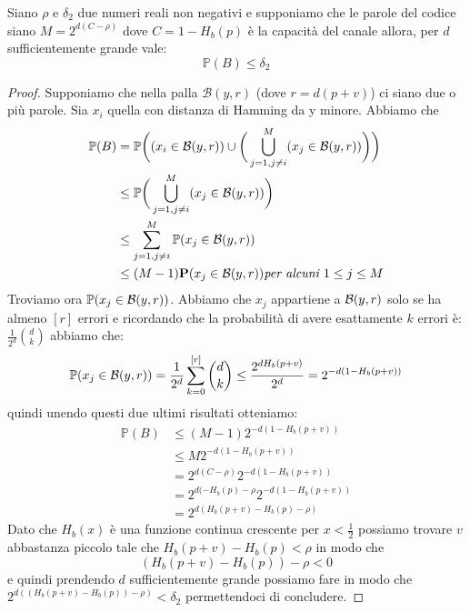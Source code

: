\begin{lem}
Siano $\rho$ e $\delta_2$ due numeri reali non negativi e supponiamo che le parole del codice siano $M=2^{d(C-\rho)}$ dove $C=1-H_b(p)$ è la capacità del canale allora, per $d$ sufficientemente grande vale:
$$\mathbb{P}(B)\leq \delta_2$$
\end{lem}
\begin{proof}
Supponiamo che nella palla $\mathcal{B}(y,r)$ (dove $r=d(p+v)$) ci siano due o più parole. Sia $x_i$ quella con distanza di Hamming da y minore. Abbiamo che
\[
\begin{split}
\mathbb{P}(B)&=\mathbb{P}\bigg( (x_i\in \mathcal{B}(y,r)) \cup \bigg( \bigcup_{j=1,j\neq i}^M (x_j \in \mathcal{B}(y,r) ) \bigg) \bigg)\\
&\leq \mathbb{P}\bigg( \bigcup_{j=1,j\neq i}^M (x_j \in \mathcal{B}(y,r) ) \bigg)\\
& \leq \sum_{j=1,j\neq i}^M \mathbb{P}(x_j\in \mathcal{B}(y,r))\\
&\leq (M-1) \mathbf{P}(x_j \in \mathcal{B}(y,r) ) \textit{per alcuni } 1\leq j \leq M
\end{split}
\]
Troviamo ora $\mathbb{P}(x_j\in \mathcal{B}(y,r))$. Abbiamo che $x_j$ appartiene a $\mathcal{B}(y,r)$ solo se ha almeno $[r]$ errori e ricordando che la probabilità di avere esattamente $k$ errori è: $\frac{1}{2^d} {d \choose k}$ abbiamo che:
$$\mathbb{P}(x_j\in \mathcal{B}(y,r))=\frac{1}{2^d} \sum_{k=0}^{[r]} {d \choose k}\leq \frac{2^{dH_b(p+v)}}{2^d}=2^{-d(1-H_b(p+v))}$$
quindi unendo questi due ultimi risultati otteniamo:
\[
\begin{split}
\mathbb{P}(B) &\leq (M-1)2^{-d(1-H_b(p+v))}\\
&\leq M2^{-d(1-H_b(p+v))}\\
& = 2^{d(C-\rho)}2^{-d(1-H_b(p+v))}\\
& = 2^{d(-H_b(p)-\rho}2^{-d(1-H_b(p+v))}\\
& =2^{d(H_b(p+v)-H_b(p)-\rho)}
\end{split}
\]
Dato che $H_b(x)$ è una funzione continua crescente per $x< \frac{1}{2} $ possiamo trovare $v$ abbastanza piccolo tale che $H_b(p+v)-H_b(p)<\rho$ in modo che 
$$(H_b(p+v)-H_b(p))-\rho < 0$$
e quindi prendendo $d$ sufficientemente grande possiamo fare in modo che $2^{d((H_b(p+v)-H_b(p))-\rho )}<\delta_2$ permettendoci di concludere.
\end{proof}


